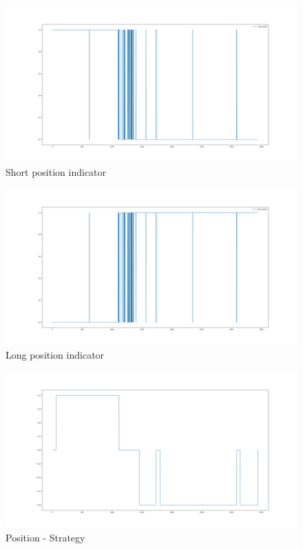 \documentclass[12pt]{article}
\begin{document}
\begin{figure}[h!]
	\centering
  \includegraphics[width=\textwidth]{strategy3.png}
  \caption{Short position indicator}
  \label{fig:strat3}
\end{figure}
\begin{figure}[h!]
	\centering
  \includegraphics[width=\textwidth]{strategy4.png}
  \caption{Long position indicator}
  \label{fig:strat4}
\end{figure}
\begin{figure}[h!]
	\centering
  \includegraphics[width=\textwidth]{strategy5.png}
  \caption{Position - Strategy}
  \label{fig:strat5}
\end{figure}
\end{document}

